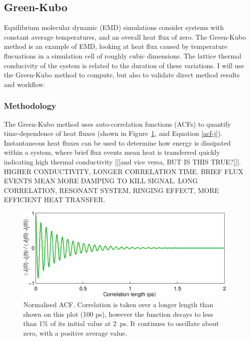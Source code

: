 \subsection{Green-Kubo}

Equilibrium molecular dynamic (EMD) simulations consider systems with constant average temperatures, and an overall heat flux of zero. The Green-Kubo method is an example of EMD, looking at heat flux caused by temperature flucuations in a simulation cell of roughly cubic dimensions. The lattice thermal conducivity of the system is related to the duration of these variations. I will use the Green-Kubo method to compute, but also to validate direct method results and workflow.	

\subsubsection{Methodology}

The Green-Kubo method uses auto-correlation functions (ACFs) to quantify time-dependence of heat fluxes (shown in Figure~\ref{fig:gk_acf}, and Equation \ref{acf-j}). Instantaneous heat fluxes can be used to determine how energy is dissipated within a system, where brief flux events mean heat is transferred quickly indicating high thermal conductivity [[[and vice versa, BUT IS THIS TRUE?]]]. HIGHER CONDUCTIVITY, LONGER CORRELATION TIME. BRIEF FLUX EVENTS MEAN MORE DAMPING TO KILL SIGNAL. LONG CORRELATION, RESONANT SYSTEM, RINGING EFFECT, MORE EFFICIENT HEAT TRANSFER.

\begin{figure}[h]
\includegraphics[width=\linewidth]{Figures/gk_acf.png}
\caption{Normalised ACF. Correlation is taken over a longer length than shown on this plot (100 ps), however the function decays to less than 1\% of its initial value at 2~ps. It continues to oscillate about zero, with a positive average value.}
\label{fig:gk_acf}
\end{figure}

